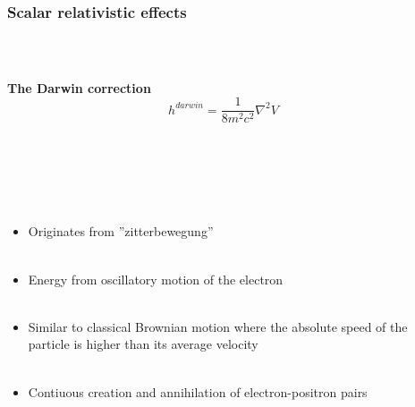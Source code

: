 \documentclass[mathserif,8pt]{beamer}
\begin{document}
\begin{frame}
    \frametitle{Scalar relativistic effects}
    \ \\
    \begin{columns}
    \begin{column}{.50\textwidth}
    \centering
    \textbf{The Darwin correction}
    \begin{equation}
	\nonumber
	h^{darwin} = \frac{1}{8m^2c^2} \nabla^2 V
    \end{equation}
    \ \\
    \ \\
    \ \\
    \ \\
    \ \\
    \begin{itemize}
	\item Originates from ''zitterbewegung''\\
	\ \\
	\item Energy from oscillatory motion of the electron\\
	\ \\
	\item Similar to classical Brownian motion where the absolute speed
	of the particle is higher than its average velocity\\
	\ \\
	\item Contiuous creation and annihilation of electron-positron pairs
    \end{itemize}
    \ \\
    \end{column}
    \begin{column}{.50\textwidth}
	\centering

\end{column}
\end{columns}
\end{frame}
\end{document}
